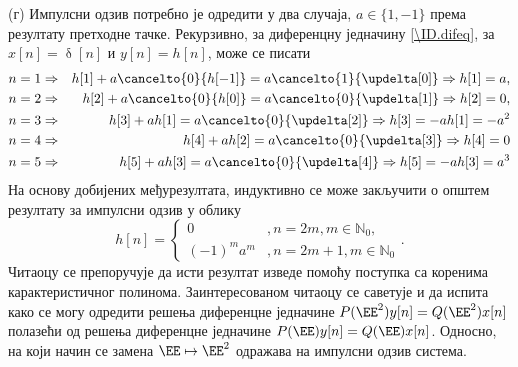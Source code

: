 (г) Импулсни одзив потребно је одредити у два случаја, $a \in \{1,-1\}$ према резултату претходне тачке. 
Рекурзивно, за диференцну једначину \eqref{\ID.difeq}, за $x[n] = \updelta[n]$ и $y[n] = h[n]$, може се писати 
\begin{eqnarray}
    n = 1 &\Rightarrow& h[1] + a \cancelto{0}{h[-1]} = a \cancelto{1}{\updelta[0]} 
    \Rightarrow h[1] = a, \\
    n = 2 &\Rightarrow& h[2] + a \cancelto{0}{h[0]} = a \cancelto{0}{\updelta[1]} 
    \Rightarrow h[2] = 0, \\
    n = 3 &\Rightarrow& h[3] + a h[1] = a \cancelto{0}{\updelta[2]} 
    \Rightarrow h[3] = - a h[1] = - a^2 \\
    n = 4 &\Rightarrow& h[4] + a h[2] = a \cancelto{0}{\updelta[3]} 
    \Rightarrow h[4] = 0 \\
    n = 5 &\Rightarrow& h[5] + a h[3] = a \cancelto{0}{\updelta[4]} 
    \Rightarrow h[5] = - a h[3] = a^3 \\
\end{eqnarray}
На основу добијених међурезултата, индуктивно се може закључити о општем резултату за импулсни одзив у облику 
\begin{equation}
    h[n] = 
    \begin{cases}
        0 &, n = 2m, m \in \mathbb N_0, \\
        (-1)^m a^{m} &, n = 2m + 1, m \in \mathbb N_0 
    \end{cases}.
\end{equation}
Читаоцу се препоручује да исти резултат изведе помоћу поступка са коренима карактеристичног полинома.  
Заинтересованом читаоцу се саветује и да испита како се могу одредити 
решења диференцне једначине $P(\EE^2) y[n] = Q(\EE^2) x[n]$ полазећи од решења диференцне  
једначине $P(\EE) y[n] = Q(\EE) x[n]$. Односно, на који начин се замена $\EE \mapsto \EE^2$ 
одражава на импулсни одзив система. 